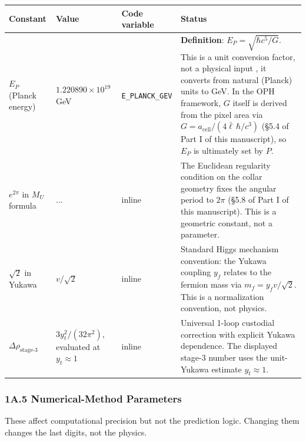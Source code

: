 {\def\LTcaptype{none} %
\setlength{\LTleft}{0pt}
\setlength{\LTright}{0pt}
\setlength{\tabcolsep}{1.2pt}
\renewcommand{\arraystretch}{1.05}
\footnotesize
\begin{longtable}[]{@{}>{\RaggedRight\arraybackslash}p{}>{\RaggedRight\arraybackslash}p{}>{\RaggedRight\arraybackslash}p{}>{\RaggedRight\arraybackslash}p{}@{}}
\toprule\noalign{}
Constant & Value & Code variable & Status \\
\midrule\noalign{}
\endhead
\bottomrule\noalign{}
\endlastfoot
\(E_P\) (Planck energy) & \(1.220890 \times 10^{19}\) GeV & \texttt{E\_PLANCK\_GEV} & \textbf{Definition}: \(E_P = \sqrt{\hbar c^5/G}\). This is a unit conversion factor, not a physical input , it converts from natural (Planck) units to GeV. In the OPH framework, \(G\) itself is derived from the pixel area via \(G = a_{\text{cell}}/(4\bar{\ell}\,\hbar/c^3)\) (§5.4 of Part I of this manuscript), so \(E_P\) is ultimately set by \(P\). \\
\(e^{2\pi}\) in \(M_U\) formula & 535.49... & inline & The Euclidean regularity condition on the collar geometry fixes the angular period to \(2\pi\) (§5.8 of Part I of this manuscript). This is a geometric constant, not a parameter. \\
\(\sqrt{2}\) in Yukawa & \(v/\sqrt{2}\) & inline & Standard Higgs mechanism convention: the Yukawa coupling \(y_f\) relates to the fermion mass via \(m_f = y_f v / \sqrt{2}\). This is a normalization convention, not physics. \\
\(\Delta\rho_{\text{stage-3}}\) & \(3y_t^2/(32\pi^2)\), evaluated at \(y_t \approx 1\) & inline & Universal 1-loop custodial correction with explicit Yukawa dependence. The displayed stage-3 number uses the unit-Yukawa estimate \(y_t \approx 1\). \\
\end{longtable}
}

\subsubsection{1A.5 Numerical-Method Parameters}\label{1a5-numerical-method-parameters}

These affect computational precision but not the prediction logic. Changing them changes the last digits, not the physics.

